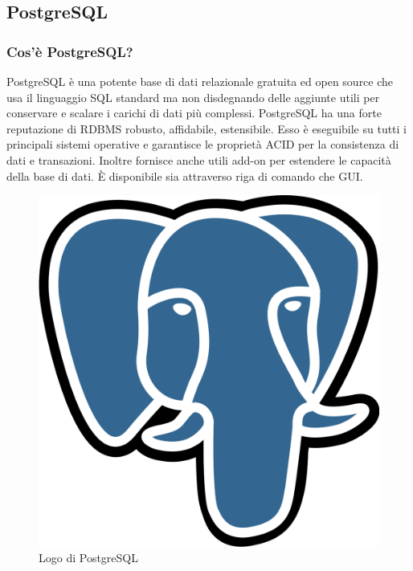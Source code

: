         \subsection{PostgreSQL}
            \subsubsection{Cos'è PostgreSQL? \cite{PostgreSQL1}}
                PostgreSQL è una potente base di dati relazionale gratuita ed open source che usa il linguaggio SQL standard ma non disdegnando delle aggiunte utili per conservare e scalare i carichi di dati più complessi. PostgreSQL ha una forte reputazione di RDBMS robusto, affidabile, estensibile. Esso è eseguibile su tutti i principali sistemi operative e garantisce le proprietà ACID per la consistenza di dati e transazioni. Inoltre fornisce anche utili add-on per estendere le capacità della base di dati. È disponibile sia attraverso riga di comando che GUI.
            \begin{figure}[htbp!]
                \centering
                \includegraphics[width=0.2\linewidth]{Immagini/System Design/PostgreSQL.png}
                \caption{Logo di PostgreSQL}
            \end{figure}
